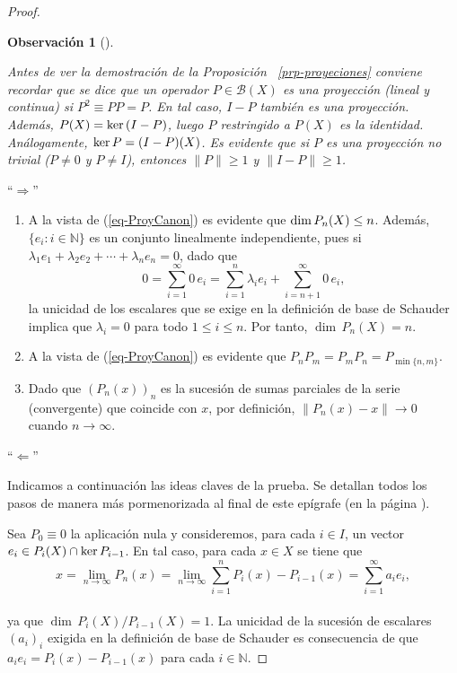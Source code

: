 \documentclass[
  spanish,
  letterpaper,
  DIV=11,
  numbers=noendperiod]{scrreprt}
\theoremstyle{definition}
\theoremstyle{remark}
\theoremstyle{definition}
\theoremstyle{exampstyle}
\theoremstyle{plain}
\newtheorem{conjecture}{Observación}[chapter]
\theoremstyle{plain}
\theoremstyle{definition}
\theoremstyle{plain}
\theoremstyle{remark}
\begin{document}
\begin{proof}
\leavevmode

\hspace*{1mm}

\begin{conjecture}[]\protect\hypertarget{cnj-1}{}\label{cnj-1}

Antes de ver la demostración de la Proposición ~\ref{prp-proyeciones}
conviene recordar que se dice que un operador \(P\in\mathcal{B}(X)\) es
una \emph{proyección} (lineal y continua) si \(P^2\equiv PP=P\). En tal
caso, \(I-P\) también es una proyección. Además,
\(P(X)={\rm ker}\,(I-P)\), luego \(P\) restringido a \(P(X)\) es la
identidad. Análogamente, \({\rm ker}\,P=(I-P)(X)\). Es evidente que si
\(P\) es una proyección no trivial (\(P\neq 0\) y \(P\neq I\)), entonces
\(\|P\|\geq 1\) y \(\|I-P\|\geq 1\).

\end{conjecture}

\noindent ``\(\Longrightarrow\)''

\begin{enumerate}
\def\labelenumi{(\alph{enumi})}
\item
  A la vista de (\ref{eq-ProyCanon}) es evidente que
  \({\rm dim}\,P_n(X)\leq n\). Además, \(\{e_i\colon i\in\mathbb{N}\}\)
  es un conjunto linealmente independiente, pues si
  \(\lambda_1e_1+\lambda_2 e_2+\cdots+\lambda_ne_n=0\), dado que \[
  0=\sum_{i=1}^{\infty}0\,e_i=\sum_{i=1}^n{\lambda_ie_i} + \sum_{i=n+1}^{\infty}0\,e_i,
  \] la unicidad de los escalares que se exige en la definición de base
  de Schauder implica que \(\lambda_i=0\) para todo \(1\leq i\leq n\).
  Por tanto, \(\dim\,P_n(X)=n\).
\item
  A la vista de (\ref{eq-ProyCanon}) es evidente que
  \(P_nP_m=P_mP_n=P_{\min\{n,m\}}\).
\item
  Dado que \((P_n(x))_n\) es la sucesión de sumas parciales de la serie
  (convergente) que coincide con \(x\), por definición,
  \(\|P_n(x)-x\|\to 0\) cuando \(n\to\infty\). \medskip
\end{enumerate}

\noindent``\(\Longleftarrow\)''

Indicamos a continuación las ideas claves de la prueba. Se detallan
todos los pasos de manera más pormenorizada al final de este epígrafe
(en la página \pageref{D:proyecciones}).

Sea \(P_0\equiv 0\) la aplicación nula y consideremos, para cada
\(i\in I\), un vector \(e_i\in P_i(X)\cap
{\rm ker}\,P_{i-1}\). En tal caso, para cada \(x\in X\) se tiene que\\
\[
x=\lim_{n\to\infty}{P_n(x)}=\lim_{n\to\infty}\sum_{i=1}^nP_i(x) - P_{i-1}(x)=  \sum_{i=1}^\infty a_ie_i,
\]\\
ya que \(\dim\,P_i(X)/P_{i-1}(X)=1\). La unicidad de la sucesión de
escalares \((a_i)_i\) exigida en la definición de base de Schauder es
consecuencia de que \(a_ie_i=P_i(x)-P_{i-1}(x)\) para cada
\(i\in\mathbb{N}\).
\end{proof}
\end{document}
